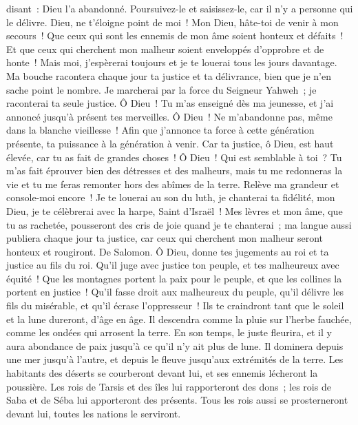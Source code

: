 \begin{multicols}{2}
disant~: Dieu l'a abandonné. Poursuivez-le et saisissez-le, car il n'y a personne qui le délivre.
Dieu, ne t'éloigne point de moi~! Mon Dieu, hâte-toi de venir à mon secours~!
Que ceux qui sont les ennemis de mon âme soient honteux et défaits~! Et que ceux qui cherchent mon malheur soient enveloppés d'opprobre et de honte~!
Mais moi, j'espèrerai toujours et je te louerai tous les jours davantage.
Ma bouche racontera chaque jour ta justice et ta délivrance, bien que je n'en sache point le nombre.
Je marcherai par la force du Seigneur Yahweh~; je raconterai ta seule justice.
Ô Dieu~! Tu m'as enseigné dès ma jeunesse, et j'ai annoncé jusqu'à présent tes merveilles.
Ô Dieu~! Ne m'abandonne pas, même dans la blanche vieillesse~! Afin que j'annonce ta force à cette génération présente, ta puissance à la génération à venir.
Car ta justice, ô Dieu, est haut élevée, car tu as fait de grandes choses~! Ô Dieu~! Qui est semblable à toi~?
Tu m'as fait éprouver bien des détresses et des malheurs, mais tu me redonneras la vie et tu me feras remonter hors des abîmes de la terre.
Relève ma grandeur et console-moi encore~!
Je te louerai au son du luth, je chanterai ta fidélité, mon Dieu, je te célèbrerai avec la harpe, Saint d'Israël~!
Mes lèvres et mon âme, que tu as rachetée, pousseront des cris de joie quand je te chanterai~;
ma langue aussi publiera chaque jour ta justice, car ceux qui cherchent mon malheur seront honteux et rougiront.
\VerseOne{}De Salomon. Ô Dieu, donne tes jugements au roi et ta justice au fils du roi.
Qu'il juge avec justice ton peuple, et tes malheureux avec équité~!
Que les montagnes portent la paix pour le peuple, et que les collines la portent en justice~!
Qu'il fasse droit aux malheureux du peuple, qu'il délivre les fils du misérable, et qu'il écrase l'oppresseur~!
Ils te craindront tant que le soleil et la lune dureront, d'âge en âge.
Il descendra comme la pluie sur l'herbe fauchée, comme les ondées qui arrosent la terre.
En son temps, le juste fleurira, et il y aura abondance de paix jusqu'à ce qu'il n'y ait plus de lune.
Il dominera depuis une mer jusqu'à l'autre, et depuis le fleuve jusqu'aux extrémités de la terre.
Les habitants des déserts se courberont devant lui, et ses ennemis lécheront la poussière.
Les rois de Tarsis et des îles lui rapporteront des dons~; les rois de Saba et de Séba lui apporteront des présents.
Tous les rois aussi se prosterneront devant lui, toutes les nations le serviront.

\end{multicols}
